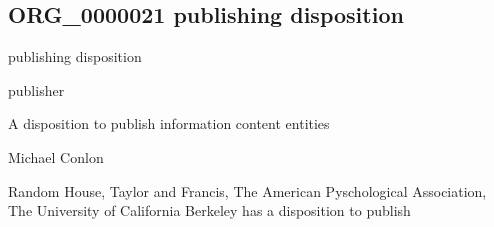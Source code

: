 \documentclass[letterpaper,10pt,english]{sphinxmanual}
\begin{document}
\subsection{ORG\_0000021 \sphinxhyphen{} publishing disposition}
\label{\detokenize{doc-ORG_0000021:org-0000021-publishing-disposition}}\label{\detokenize{doc-ORG_0000021:index-0}}\label{\detokenize{doc-ORG_0000021::doc}}
\begin{sphinxShadowBox}

\sphinxAtStartPar
publishing disposition
\end{sphinxShadowBox}

\begin{sphinxShadowBox}

\sphinxAtStartPar
publisher
\end{sphinxShadowBox}

\begin{sphinxShadowBox}

\sphinxAtStartPar
{\hyperref[\detokenize{doc-BFO_0000016::doc}]{}}
\end{sphinxShadowBox}

\begin{sphinxShadowBox}

\sphinxAtStartPar
A disposition to publish information content entities
\end{sphinxShadowBox}

\begin{sphinxShadowBox}

\sphinxAtStartPar
Michael Conlon 
\end{sphinxShadowBox}

\begin{sphinxShadowBox}

\sphinxAtStartPar
Random House, Taylor and Francis, The American Pyschological Association, The University of California Berkeley has a disposition to publish
\end{sphinxShadowBox}

\begin{sphinxShadowBox}

\sphinxAtStartPar
{}
\end{sphinxShadowBox}
\end{document}
